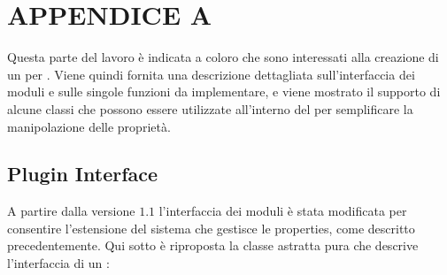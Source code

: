 \chapter*{APPENDICE A}
\label{appendice_a}

Questa parte del lavoro è indicata a coloro che sono interessati alla creazione di un \plugin{} per \visualnetkit{}. Viene quindi fornita una descrizione dettagliata sull'interfaccia dei moduli e sulle singole funzioni da implementare, e viene mostrato il supporto di alcune classi che possono essere utilizzate all'interno del \plugin{} per semplificare la manipolazione delle proprietà.

\section*{Plugin Interface}
A partire dalla versione $1.1$ l'interfaccia dei moduli è stata modificata per consentire l'estensione del sistema che gestisce le properties, come descritto precedentemente. Qui sotto è riproposta la classe astratta pura che descrive l'interfaccia di un \plugin{}:

